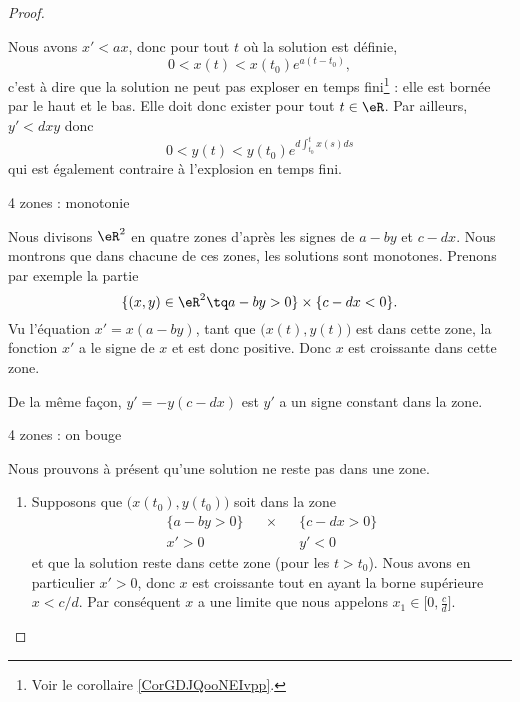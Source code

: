 \begin{proof}
\begin{subproof}
        Nous avons \( x'<ax\), donc pour tout \( t\) où la solution est définie,
        \begin{equation}
            0<x(t)<x(t_0) e^{a(t-t_0)},
        \end{equation}
        c'est à dire que la solution ne peut pas exploser en temps fini\footnote{Voir le corollaire \ref{CorGDJQooNEIvpp}.} : elle est bornée par le haut et le bas. Elle doit donc exister pour tout \( t\in \eR\). Par ailleurs, \( y'<dxy\) donc
        \begin{equation}
            0<y(t)<y(t_0) e^{d\int_{t_0}^{t}x(s)ds}
        \end{equation}
        qui est également contraire à l'explosion en temps fini.

    \item[4 zones : monotonie]

        Nous divisons \( \eR^2\) en quatre zones d'après les signes de \( a-by\) et \( c-dx\). Nous montrons que dans chacune de ces zones, les solutions sont monotones. Prenons par exemple la partie
        \begin{equation}
            \{  (x,y)\in \eR^2\tq   a-by>0 \}\times\{ c-dx<0 \}.
        \end{equation}
        Vu l'équation \( x'=x(a-by)\), tant que \( \big( x(t),y(t) \big)\) est dans cette zone, la fonction \( x'\) a le signe de \( x\) et est donc positive. Donc \( x\) est croissante dans cette zone.

        De la même façon, \( y'=-y(c-dx)\) est \( y'\) a un signe constant dans la zone.

    \item[4 zones : on bouge]

        Nous prouvons à présent qu'une solution ne reste pas dans une zone. 

        \begin{enumerate}
            \item
        Supposons que \( \big( x(t_0),y(t_0) \big) \) soit dans la zone
        \begin{subequations}
            \begin{align}
                \{ a-by>0 \}&&\times&& \{ c-dx>0 \}\\
                x'>0&&&&y'<0
            \end{align}
        \end{subequations}
        et que la solution reste dans cette zone (pour les \( t>t_0\)). Nous avons en particulier \( x'>0\), donc \( x\) est croissante tout en ayant la borne supérieure \(  x<c/d \). Par conséquent \( x\) a une limite que nous appelons \( x_1\in \mathopen[ 0 , \frac{ c }{ d } \mathclose]\).


\end{enumerate}
\end{subproof}
\end{proof}

